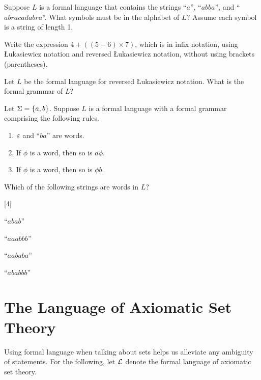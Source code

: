 \begin{exercise}
    \begin{partquestions}{\alph*}
        \item Suppose $L$ is a formal language that contains the strings ``$a$'', ``$abba$'', and ``$abracadabra$''. What symbols must be in the alphabet of $L$? Assume each symbol is a string of length 1.
        \item Write the expression $4 + ((5 - 6) \times 7)$, which is in infix notation, using {\L}ukasiewicz notation and reversed {\L}ukasiewicz notation, without using brackets (parentheses).
        \item Let $L$ be the formal language for reversed {\L}ukasiewicz notation. What is the formal grammar of $L$?
    \end{partquestions}
\end{exercise}

\begin{exercise}
    Let $\Sigma = \{a,b\}$. Suppose $L$ is a formal language with a formal grammar comprising the following rules.
    \begin{enumerate}[start=0]
        \item $\varepsilon$ and ``$ba$'' are words.
        \item If $\phi$ is a word, then so is $a\phi$.
        \item If $\phi$ is a word, then so is $\phi b$.
    \end{enumerate}
    Which of the following strings are words in $L$?
    \begin{partquestions}{\alph*}[4]
        \item ``$abab$''
        \item ``$aaabbb$''
        \item ``$aababa$''
        \item ``$ababbb$''
    \end{partquestions}
\end{exercise}

\section{The Language of Axiomatic Set Theory}
Using formal language when talking about sets helps us alleviate any ambiguity of statements. For the following, let $\mathcal{L}$ denote the formal language of axiomatic set theory.

